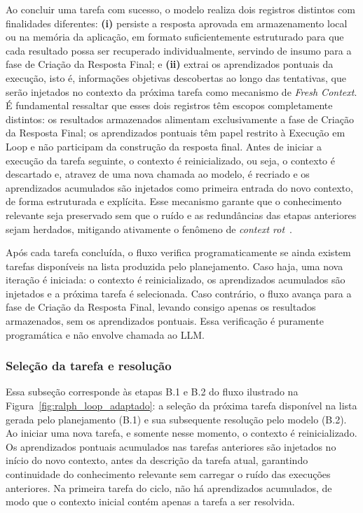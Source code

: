 \documentclass[a4paper,10pt,twocolumn]{article}
\begin{document}
Ao concluir uma tarefa com sucesso, o modelo realiza dois registros distintos com finalidades diferentes: \textbf{(i)} persiste a resposta aprovada em armazenamento local ou na memória da aplicação, em formato suficientemente estruturado para que cada resultado possa ser recuperado individualmente, servindo de insumo para a fase de Criação da Resposta Final; e \textbf{(ii)} extrai os aprendizados pontuais da execução, isto é, informações objetivas descobertas ao longo das tentativas, que serão injetados no contexto da próxima tarefa como mecanismo de \textit{Fresh Context}. É fundamental ressaltar que esses dois registros têm escopos completamente distintos: os resultados armazenados alimentam exclusivamente a fase de Criação da Resposta Final; os aprendizados pontuais têm papel restrito à Execução em Loop e não participam da construção da resposta final. Antes de iniciar a execução da tarefa seguinte, o contexto é reinicializado, ou seja, o contexto é descartado e, atravez de uma nova chamada ao modelo, é recriado e os aprendizados acumulados são injetados como primeira entrada do novo contexto, de forma estruturada e explícita. Esse mecanismo garante que o conhecimento relevante seja preservado sem que o ruído e as redundâncias das etapas anteriores sejam herdados, mitigando ativamente o fenômeno de \textit{context rot}~\cite{hong2025context}.

Após cada tarefa concluída, o fluxo verifica programaticamente se ainda existem tarefas disponíveis na lista produzida pelo planejamento. Caso haja, uma nova iteração é iniciada: o contexto é reinicializado, os aprendizados acumulados são injetados e a próxima tarefa é selecionada. Caso contrário, o fluxo avança para a fase de Criação da Resposta Final, levando consigo apenas os resultados armazenados, sem os aprendizados pontuais. Essa verificação é puramente programática e não envolve chamada ao LLM.


\subsubsection{Seleção da tarefa e resolução} \label{subsec:ExecucaoB1}

Essa subseção corresponde às etapas B.1 e B.2 do fluxo ilustrado na Figura~\ref{fig:ralph_loop_adaptado}: a seleção da próxima tarefa disponível na lista gerada pelo planejamento (B.1) e sua subsequente resolução pelo modelo (B.2). Ao iniciar uma nova tarefa, e somente nesse momento, o contexto é reinicializado. Os aprendizados pontuais acumulados nas tarefas anteriores são injetados no início do novo contexto, antes da descrição da tarefa atual, garantindo continuidade do conhecimento relevante sem carregar o ruído das execuções anteriores. Na primeira tarefa do ciclo, não há aprendizados acumulados, de modo que o contexto inicial contém apenas a tarefa a ser resolvida.
\end{document}
